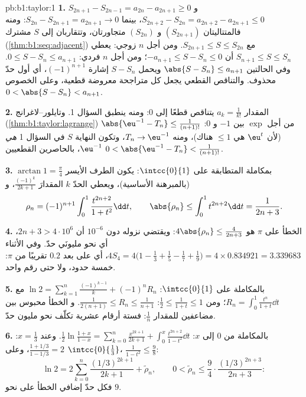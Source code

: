 \begin{solution}{pb:b1:taylor:1}
\textbf{1.} $S_{2n+1} - S_{2n-1} = a_{2n} - a_{2n+1} \geq 0$ و
$S_{2n+2} - S_{2n} = a_{2n+2} - a_{2n+1} \leq 0$، بينما $S_{2n}
- S_{2n+1} = a_{2n+1} \to 0$: ومنه فالمتتاليتان $(S_{2n+1})$ و
$(S_{2n})$ متجاورتان، وتتقاربان إلى $S$ مشترك
(\cref{thm:b1:seq:adjacent}) مع $S_{2n+1} \leq S \leq S_{2n}$.
ومن أجل $n$ زوجي: يعطي $S_{n+1} \leq S \leq S_n$ أن $-a_{n+1} \leq S -
S_n \leq 0$؛ ومن أجل $n$ فردي: $0 \leq S - S_n \leq a_{n+1}$. وفي
الحالتين $\abs{S - S_n} \leq a_{n+1}$ ويحمل $S - S_n$ إشارة
$(-1)^{n+1}$، أي أول حدّ محذوف. والتناقص القطعي يجعل
كل متراجحة معروضة قطعية، وعلى الخصوص $0 < \abs{S -
S_n} < a_{n+1}$.

\textbf{2.} المقدار $a_k = \frac{1}{k!}$ يتناقص قطعًا إلى $0$:
ومنه ينطبق السؤال 1. وتايلور--لاغرانج
(\cref{thm:b1:taylor:lagrange}) من أجل $\exp$ بين $-1$ و $0$:
$\abs{\eu^{-1} - T_n} \leq \frac{1}{(n+1)!}$ (لأن 
$\eu^t$ هي $\leq 1$ هناك)، ومنه $T_n \to \eu^{-1}$، وتكون النهاية
$S$ في السؤال 1 \emph{هي} $\eu^{-1}$، بالحاصرين القطعيين
$0 < \abs{\eu^{-1} - T_n} < \frac{1}{(n+1)!}$.

\textbf{3.} بمكاملة المتطابقة على $\intcc{0}{1}$: يكون
الطرف الأيسر $\arctan 1 = \frac\pi4$ (بالمبرهنة الأساسية)، ويعطي
الحدّ $k$ المقدارَ $\frac{(-1)^k}{2k+1}$، و
\[
\rho_n = (-1)^{n+1}\int_0^1 \frac{t^{2n+2}}{1+t^2}\dd t,
\qquad
\abs{\rho_n} \leq \int_0^1 t^{2n+2}\dd t = \frac{1}{2n+3} .
\]

\textbf{4.} الخطأ على $\pi$ هو $4\abs{\rho_n} \leq
\frac{4}{2n+3}$: ويقتضي نزوله دون $10^{-6}$ أن $2n + 3 > 4\cdot10^6$،
أي نحو مليونَي حدّ. وفي الأثناء $4S_4 = 4\bigl(1 - \frac13 +
\frac15 - \frac17 + \frac19\bigr) = 4 \times 0.834921 =
3.339683$، أي على بعد $0.2$ تقريبًا من $\pi$: خمسة حدود، ولا حتى
رقم واحد.

\textbf{5.} بالمكاملة على $\intcc{0}{1}$: $\ln 2 =
\sum_{k=1}^{n} \frac{(-1)^{k-1}}{k} + (-1)^n R_n$ مع $R_n =
\int_0^1 \frac{t^n}{1+t}\dd t$؛ ومن $\frac12 \leq \frac{1}{1+t}
\leq 1$: $\frac{1}{2(n+1)} \leq R_n \leq \frac{1}{n+1}$. و
الخطأ محبوس بين مضاعفين للمقدار $\frac1n$: فستة
أرقام عشرية تكلّف نحو مليون حدّ.

\textbf{6.} بالمكاملة من $0$ إلى $x$: $\frac12\ln\frac{1 +
x}{1 - x} = \sum_{k=0}^{n} \frac{x^{2k+1}}{2k+1} + \int_0^x
\frac{t^{2n+2}}{1-t^2}\dd t$. وعند $x = \frac13$: $\frac{1 +
1/3}{1 - 1/3} = 2$، وعلى $\intcc{0}{\frac13}$، $\frac{1}{1 -
t^2} \leq \frac98$:
\[
\ln 2 = 2\sum_{k=0}^{n} \frac{(1/3)^{2k+1}}{2k+1} +
\tilde\rho_n,
\qquad
0 < \tilde\rho_n \leq \frac{9}{4}\cdot
\frac{(1/3)^{2n+3}}{2n+3} :
\]
فكل حدّ إضافي  الخطأ على نحو $9$.


\end{solution}
